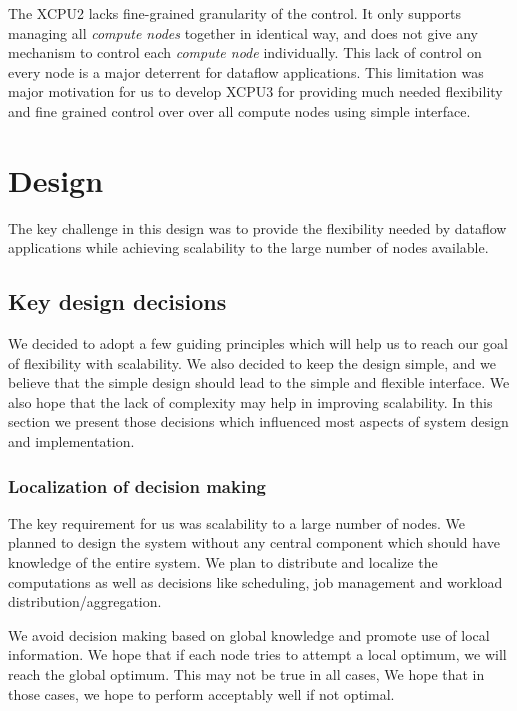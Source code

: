 \documentclass{sig-alternate}
\begin{document}
The XCPU2 lacks fine-grained granularity of the control.  It only supports
managing all \textit{compute nodes} together in identical way, and does not
give any mechanism to control each \textit{compute node} individually.  This
lack of control on every node is a major deterrent for dataflow applications.
This limitation was major motivation for us to develop XCPU3 for providing much
needed flexibility and fine grained control over over all compute nodes using
simple interface.



\section{Design}

The key challenge in this design was to provide the flexibility needed by
dataflow applications while achieving scalability to the large number of nodes
available. 

\subsection{Key design decisions}

We decided to adopt a few guiding principles which will help us to reach our
goal of flexibility with scalability.  We also decided to keep the design simple,
and we believe that the simple design should lead to the simple and flexible
interface. We also hope that the lack of complexity may help in improving
scalability. In this section we present those decisions which influenced most
aspects of system design and implementation.

\subsubsection{Localization of decision making}
The key requirement for us was scalability to a large number of nodes.  We
planned to design the system without any central component which should have
knowledge of the entire system.  We plan to distribute and localize the
computations as well as decisions like scheduling, job management and
workload distribution/aggregation.

We avoid decision making based on global knowledge and promote use of local
information.  We hope that if each node tries to attempt a local optimum, we
will reach the global optimum.  This may not be true in all cases, We hope
that in those cases, we hope to perform acceptably well if not optimal.
\end{document}
